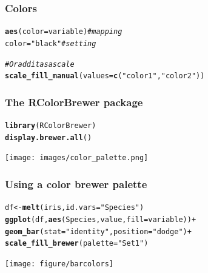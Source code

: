 \documentclass{beamer}\usepackage[]{graphicx}\usepackage[]{color}
\makeatletter
\newcommand{\hlstr}[1]{\textcolor[rgb]{0.192,0.494,0.8}{#1}}%
\newcommand{\hlcom}[1]{\textcolor[rgb]{0.678,0.584,0.686}{\textit{#1}}}%
\newcommand{\hlopt}[1]{\textcolor[rgb]{0,0,0}{#1}}%
\newcommand{\hlstd}[1]{\textcolor[rgb]{0.345,0.345,0.345}{#1}}%
\newcommand{\hlkwb}[1]{\textcolor[rgb]{0.69,0.353,0.396}{#1}}%
\newcommand{\hlkwc}[1]{\textcolor[rgb]{0.333,0.667,0.333}{#1}}%
\newcommand{\hlkwd}[1]{\textcolor[rgb]{0.737,0.353,0.396}{\textbf{#1}}}%
\newenvironment{kframe}{%
 \def\at@end@of@kframe{}%
 \ifinner\ifhmode%
  \def\at@end@of@kframe{\end{minipage}}%
  \begin{minipage}{\columnwidth}%
 \fi\fi%
 \def\FrameCommand##1{\hskip\@totalleftmargin \hskip-\fboxsep
 \colorbox{shadecolor}{##1}\hskip-\fboxsep
     \hskip-\linewidth \hskip-\@totalleftmargin \hskip\columnwidth}%
 \MakeFramed {\advance\hsize-\width
   \@totalleftmargin\z@ \linewidth\hsize
   \@setminipage}}%
 {\par\unskip\endMakeFramed%
 \at@end@of@kframe}
\newenvironment{knitrout}{}{} %
\makeatother
\begin{document}

\begin{frame}[fragile]
\frametitle{Colors}
\begin{knitrout}\footnotesize
{}\color{fgcolor}\begin{kframe}
\begin{alltt}
\hlkwd{aes}\hlstd{(}\hlkwc{color} \hlstd{= variable)} \hlcom{# mapping}
\hlstd{color} \hlkwb{=} \hlstr{"black"} \hlcom{# setting}

\hlcom{# Or add it as a scale}
\hlkwd{scale_fill_manual}\hlstd{(}\hlkwc{values} \hlstd{=} \hlkwd{c}\hlstd{(}\hlstr{"color1"}\hlstd{,} \hlstr{"color2"}\hlstd{))}
\end{alltt}
\end{kframe}
\end{knitrout}
\end{frame}


\begin{frame}[fragile]
\frametitle{The RColorBrewer package}
\begin{knitrout}\footnotesize
{}\color{fgcolor}\begin{kframe}
\begin{alltt}
\hlkwd{library}\hlstd{(RColorBrewer)}
\hlkwd{display.brewer.all}\hlstd{()}
\end{alltt}
\end{kframe}
\end{knitrout}
\begin{center}
\texttt{[image: images/color\_palette.png]}
\end{center}
\end{frame}


\begin{frame}[fragile]
\frametitle{Using a color brewer palette}
\begin{knitrout}\footnotesize
{}\color{fgcolor}\begin{kframe}
\begin{alltt}
\hlstd{df}  \hlkwb{<-} \hlkwd{melt}\hlstd{(iris,} \hlkwc{id.vars} \hlstd{=} \hlstr{"Species"}\hlstd{)}
\hlkwd{ggplot}\hlstd{(df,} \hlkwd{aes}\hlstd{(Species, value,} \hlkwc{fill} \hlstd{= variable))} \hlopt{+}
\hlkwd{geom_bar}\hlstd{(}\hlkwc{stat} \hlstd{=} \hlstr{"identity"}\hlstd{,} \hlkwc{position} \hlstd{=} \hlstr{"dodge"}\hlstd{)} \hlopt{+}
\hlkwd{scale_fill_brewer}\hlstd{(}\hlkwc{palette} \hlstd{=} \hlstr{"Set1"}\hlstd{)}
\end{alltt}
\end{kframe}

{\centering \texttt{[image: figure/barcolors]} 

}



\end{knitrout}
\end{frame}
\end{document}
